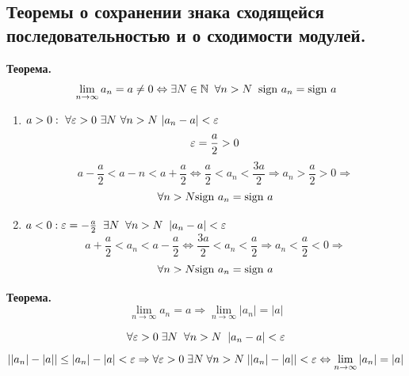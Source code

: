 \subsection{Теоремы о сохранении знака сходящейся последовательностью и о сходимости модулей.}

\begin{tcolorbox}
	\textbf{Теорема.}
	\[ \lim_{n\to\infty} a_n = a \not=0 \Leftrightarrow \exists N \in \mathbb{N}\;\; \forall n > N\;\; \text{sign\ } a_n = \text{sign\ } a \]
\end{tcolorbox}
\begin{tcolorbox}[title=Доказательство]
	\begin{enumerate}
		\item $a > 0:\ \forall \eps > 0\ \exists N\ \forall n > N\ |a_n - a|<\eps$
		\[ \varepsilon = \frac{a}{2} > 0 \]
		\[ a - \frac{a}{2} < a-n < a + \frac{a}{2} \Leftrightarrow \frac{a}{2} < a_n < \frac{3a}{2} \Rightarrow a_n > \frac{a}{2} > 0 \Rightarrow \]
		\[ \forall n > N \text{sign\ } a_n = \text{sign\ } a \]
	\item $a < 0: \varepsilon = -\frac{a}{2}\;\; \exists N \;\; \forall n > N\;\; |a_n - a| < \varepsilon$
		\[ a + \frac{a}{2} < a_n < a - \frac{a}{2} \Leftrightarrow \frac{3a}{2} < a_n < \frac{a}{2} \Rightarrow a_n < \frac{a}{2} < 0 \Rightarrow \]
		\[ \forall n > N \text{sign\ } a_n = \text{sign\ } a \]
	\end{enumerate}
\end{tcolorbox}

\begin{tcolorbox}
	\textbf{Теорема.}
	\[ \lim_{n\to\infty} a_n = a \Rightarrow \lim_{n\to\infty} |a_n| = |a| \]
\end{tcolorbox}

\begin{tcolorbox}[title=Доказательство]
	\[ \forall \varepsilon > 0\; \exists N\;\; \forall n > N\;\; | a_n - a| < \varepsilon \]
	\[ ||a_n| - |a|| \leq |a_n| - |a| < \varepsilon \Rightarrow \forall \varepsilon > 0\; \exists N \; \forall n > N\; ||a_n| - |a|| < \varepsilon \Leftrightarrow \lim_{n\to\infty} |a_n| = |a| \]
\end{tcolorbox}

